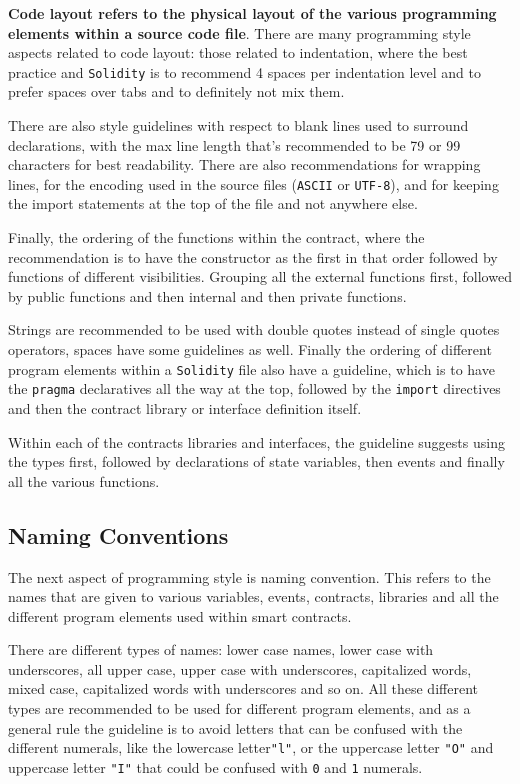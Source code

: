 \textbf{Code layout refers to the physical layout of the various
programming elements within a source code file}. There are many
programming style aspects related to code layout: those related to
indentation, where the best practice and \texttt{Solidity} is to
recommend 4 spaces per indentation level and to prefer spaces over tabs
and to definitely not mix them.

There are also style guidelines with respect to blank lines used to
surround declarations, with the max line length that's recommended to be
79 or 99 characters for best readability. There are also recommendations
for wrapping lines, for the encoding used in the source files
(\texttt{ASCII} or \texttt{UTF-8}), and for keeping the import
statements at the top of the file and not anywhere else.

Finally, the ordering of the functions within the contract, where the
recommendation is to have the constructor as the first in that order
followed by functions of different visibilities. Grouping all the
external functions first, followed by public functions and then internal
and then private functions.

Strings are recommended to be used with double quotes instead of single
quotes operators, spaces have some guidelines as well. Finally the
ordering of different program elements within a \texttt{Solidity} file
also have a guideline, which is to have the \texttt{pragma} declaratives
all the way at the top, followed by the \texttt{import} directives and
then the contract library or interface definition itself.

Within each of the contracts libraries and interfaces, the guideline
suggests using the types first, followed by declarations of state
variables, then events and finally all the various functions.

\subsection{Naming Conventions}\label{naming-conventions}

The next aspect of programming style is naming convention. This refers
to the names that are given to various variables, events, contracts,
libraries and all the different program elements used within smart
contracts.

There are different types of names: lower case names, lower case with
underscores, all upper case, upper case with underscores, capitalized
words, mixed case, capitalized words with underscores and so on. All
these different types are recommended to be used for different program
elements, and as a general rule the guideline is to avoid letters that
can be confused with the different numerals, like the lowercase
letter\texttt{"l"}, or the uppercase letter \texttt{"O"} and uppercase
letter \texttt{"I"} that could be confused with \texttt{0} and
\texttt{1} numerals.

